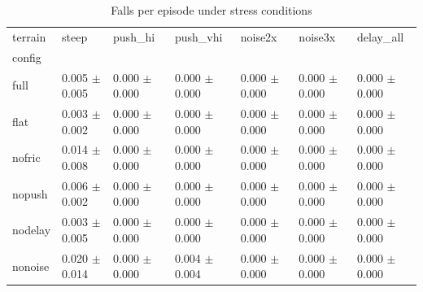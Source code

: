 \begin{table}
\caption{Falls per episode under stress conditions}
\label{tab:tab_falls_stress}
\begin{tabular}{lllllll}
\toprule
terrain & steep & push_hi & push_vhi & noise2x & noise3x & delay_all \\
config &  &  &  &  &  &  \\
\midrule
full & 0.005 $\pm$ 0.005 & 0.000 $\pm$ 0.000 & 0.000 $\pm$ 0.000 & 0.000 $\pm$ 0.000 & 0.000 $\pm$ 0.000 & 0.000 $\pm$ 0.000 \\
flat & 0.003 $\pm$ 0.002 & 0.000 $\pm$ 0.000 & 0.000 $\pm$ 0.000 & 0.000 $\pm$ 0.000 & 0.000 $\pm$ 0.000 & 0.000 $\pm$ 0.000 \\
nofric & 0.014 $\pm$ 0.008 & 0.000 $\pm$ 0.000 & 0.000 $\pm$ 0.000 & 0.000 $\pm$ 0.000 & 0.000 $\pm$ 0.000 & 0.000 $\pm$ 0.000 \\
nopush & 0.006 $\pm$ 0.002 & 0.000 $\pm$ 0.000 & 0.000 $\pm$ 0.000 & 0.000 $\pm$ 0.000 & 0.000 $\pm$ 0.000 & 0.000 $\pm$ 0.000 \\
nodelay & 0.003 $\pm$ 0.005 & 0.000 $\pm$ 0.000 & 0.000 $\pm$ 0.000 & 0.000 $\pm$ 0.000 & 0.000 $\pm$ 0.000 & 0.000 $\pm$ 0.000 \\
nonoise & 0.020 $\pm$ 0.014 & 0.000 $\pm$ 0.000 & 0.004 $\pm$ 0.004 & 0.000 $\pm$ 0.000 & 0.000 $\pm$ 0.000 & 0.000 $\pm$ 0.000 \\
\bottomrule
\end{tabular}
\end{table}
